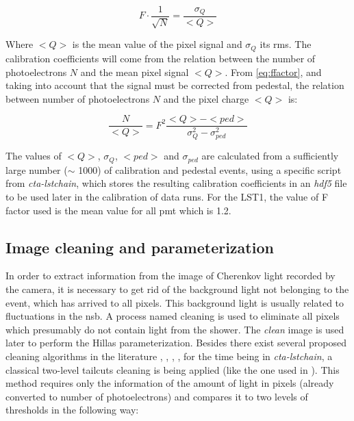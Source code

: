 \documentclass[main.tex]{subfiles}
\begin{document}
\begin{equation}
  F \cdot \frac{1}{\sqrt{N}} = \frac{\sigma_{Q}}{<Q>}
  \label{eq:ffactor}
\end{equation} 

Where $<Q>$ is the mean value of the pixel signal and $\sigma_{Q}$ its \gls{rms}. The calibration coefficients will come from the relation between the number of photoelectrons $N$ and the mean pixel signal $<Q>$. From \ref{eq:ffactor}, and taking into account that the signal must be corrected from pedestal, the relation between number of photoelectrons $N$ and the pixel charge $<Q>$ is:

\begin{equation}
  \frac{N}{<Q>} = F^{2}\frac{<Q> - <ped>}{\sigma_{Q}^{2} - \sigma_{ped}^{2}}
\end{equation}

The values of $<Q>$, $\sigma_{Q}$, $<ped>$ and $\sigma_{ped}$ are calculated from a sufficiently large number ($\sim$ 1000) of calibration and pedestal events, using a specific script from \textit{cta-lstchain}, which stores the resulting calibration coefficients in an \textit{hdf5} file to be used later in the calibration of data runs. For the LST1, the value of F factor used is the mean value for all \gls{pmt} which is 1.2.

\subsection{Image cleaning and parameterization} \label{sec:cleanpars}

In order to extract information from the image of Cherenkov light recorded by the camera, it is necessary to get rid of the background light not belonging to the event, which has arrived to all pixels. This background light is usually related to fluctuations in the \gls{nsb}. A process named cleaning is used to eliminate all pixels which presumably do not contain light from the shower. The \textit{clean} image is used later to perform the Hillas parameterization. Besides there exist several proposed cleaning algorithms in the literature \cite{2019cleaningCNN}, \cite{2013neighborcleaning}, \cite{2005Cleaningwithtimeinfo}, \cite{2001waveletcleaning}, for the time being in \textit{cta-lstchain}, a classical two-level tailcuts cleaning is being applied (like the one used in \cite{1997HEGRAperformance}). This method requires only the information of the amount of light in pixels (already converted to number of photoelectrons) and compares it to two levels of thresholds in the following way: \\
\end{document}
